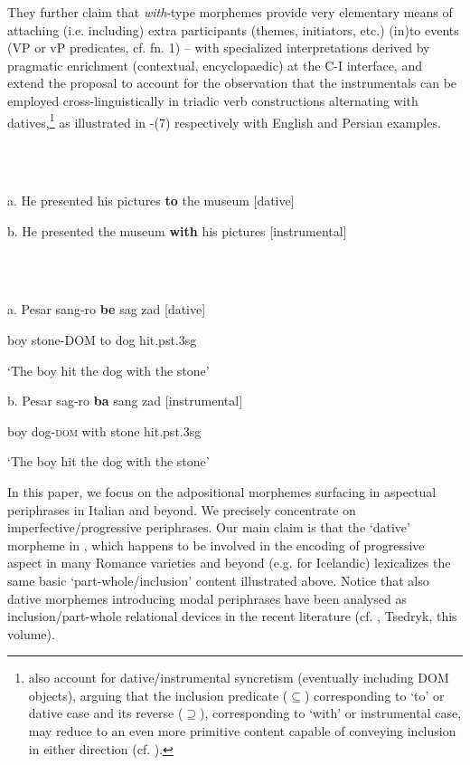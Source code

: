 \documentclass[output=paper,colorlinks,citecolor=brown]{./langscibook}
\begin{document}
They further claim that \textit{with}{}-type morphemes provide very elementary means of attaching (i.e. including) extra participants (themes, initiators, etc.) (in)to events (VP or vP predicates, cf. fn. 1) – with specialized interpretations derived by pragmatic enrichment (contextual, encyclopaedic) at the C-I interface, and extend the proposal to account for the observation that the instrumentals can be employed cross-linguistically in triadic verb constructions alternating with datives,\footnote{\citet{FrancoManzini2017b} also account for dative/instrumental syncretism (eventually including DOM objects), arguing that the inclusion predicate (\textrm{${\subseteq}$}) corresponding to ‘to’ or dative case and its reverse (\textrm{${\supseteq}$}), corresponding to ‘with’ or instrumental case, may reduce to an even more primitive content capable of conveying inclusion in either direction (cf. ).}  as illustrated in -(7) respectively with English and Persian examples. 

\ea%
    \label{ex:key:6}
    \gll\\
        \\
    \glt
    \z

            a. He presented his pictures \textbf{to} the museum    [dative]

b. He presented the museum \textbf{with} his pictures  [instrumental]

\ea%
    \label{ex:key:7}
    \gll\\
        \\
    \glt
    \z

           a.   Pesar   sang-ro   \textbf{be}   sag   zad     [dative]

boy   stone-DOM   to   dog   hit.pst.3sg 

‘The boy hit the dog with the stone’ 

  b.   Pesar   sag-ro     \textbf{ba}   sang   zad [instrumental]

  boy   dog-\textsc{dom}  with   stone   hit.pst.3sg 

  ‘The boy hit the dog with the stone’

In this paper, we focus on the adpositional morphemes surfacing in aspectual periphrases in Italian and beyond. We precisely concentrate on imperfective/progressive periphrases. Our main claim is that the ‘dative’ morpheme in , which happens to be involved in the encoding of progressive aspect in many Romance varieties \citep{ManziniLorussoSavoia2017} and beyond (e.g. \citealt{Jóhannsdóttir2012} for Icelandic) lexicalizes the same basic ‘part-whole/inclusion’ content illustrated above. Notice that also dative morphemes introducing modal periphrases have been analysed as inclusion/part-whole relational devices in the recent literature (cf. \citealt{BjorkmanCowper2016}, Tsedryk, this volume). 
\end{document}
